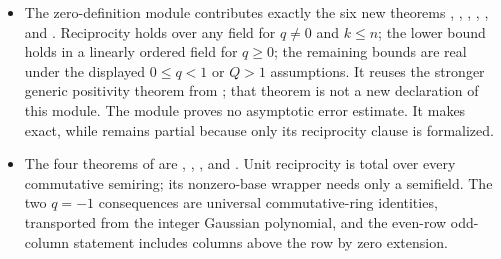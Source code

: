 \documentclass[11pt,a4paper,oneside,openany]{book}
\theoremstyle{definition}
\theoremstyle{remark}
\begin{document}
\begin{itemize}
\item The zero-definition module
 contributes exactly the six new theorems
,
,
,
,
, and
.  Reciprocity holds over
any field for $q\ne0$ and $k\le n$; the lower bound holds in a linearly
ordered field for $q\ge0$; the remaining bounds are real under the displayed
$0\le q<1$ or $Q>1$ assumptions.  It reuses the stronger generic positivity
theorem  from
; that theorem is not a new declaration of
this module.  The module proves no asymptotic error estimate.  It makes
exact, while  remains
partial because only its reciprocity clause is formalized.

\item The four theorems of  are
,
,
, and
.  Unit reciprocity is
total over every commutative semiring; its nonzero-base wrapper needs only a
semifield.  The two \(q=-1\) consequences are universal commutative-ring
identities, transported from the integer Gaussian polynomial, and the
even-row odd-column statement includes columns above the row by zero
extension.


\end{itemize}
\end{document}
